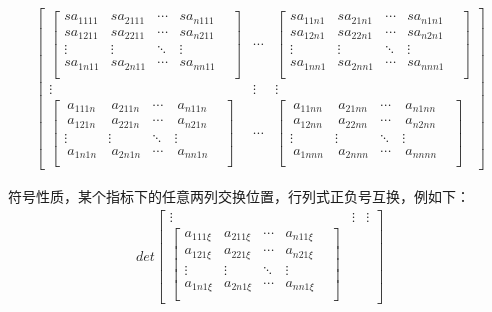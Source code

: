 \documentclass{amsc}          %
\numberwithin{equation}{section} %
\begin{document}
\begin{list}{}
\begin{align*}
\begin{bmatrix}
  \begin{bmatrix}
 sa_{1111}& sa_{2111}&\cdots&sa_{n111}\\
 sa_{1211}& sa_{2211}&\cdots&sa_{n211}\\
  \vdots&\vdots&\ddots &\vdots& \\
sa_{1n11}& sa_{2n11}&\cdots&sa_{nn11}\\
 \end{bmatrix}&
\cdots&
\begin{bmatrix}
sa_{11n1}& sa_{21n1}&\cdots&sa_{n1n1}\\
sa_{12n1}& sa_{22n1}&\cdots&sa_{n2n1}\\
  \vdots&\vdots&\ddots &\vdots& \\
sa_{1nn1}& sa_{2nn1}&\cdots&sa_{nnn1}\\
\end{bmatrix}\\
\vdots&\vdots&\vdots\\
\begin{bmatrix}
\  a_{111n}& \  a_{211n}&\cdots&\  a_{n11n}\\
\  a_{121n}& \  a_{221n}&\cdots&\  a_{n21n}\\
  \vdots&\vdots&\ddots &\vdots& \\
\  a_{1n1n}& \  a_{2n1n}&\cdots&\  a_{nn1n}\\
\end{bmatrix}&
\cdots&
\begin{bmatrix}
\  a_{11nn}& \  a_{21nn}&\cdots& \  a_{n1nn}\\
\  a_{12nn}& \  a_{22nn}&\cdots&\  a_{n2nn}\\
  \vdots&\vdots&\ddots &\vdots& \\
\  a_{1nnn}& \  a_{2nnn}&\cdots& \  a_{nnnn}\\
\end{bmatrix}
\end{bmatrix}
 \end{align*}
 \item
 符号性质，某个指标下的任意两列交换位置，行列式正负号互换，例如下：
\begin{align*}
det
  \begin{bmatrix}
\vdots&\vdots&\vdots\\
 \begin{bmatrix}
 a_{111\xi}& a_{211\xi}&\cdots&a_{n11\xi}\\
 a_{121\xi}& a_{221\xi}&\cdots&a_{n21\xi}\\
  \vdots&\vdots&\ddots &\vdots&\\
a_{1n1\xi}& a_{2n1\xi}&\cdots&a_{nn1\xi}\\

\end{bmatrix}
\end{bmatrix}
\end{align*}
\end{list}
\end{document}

